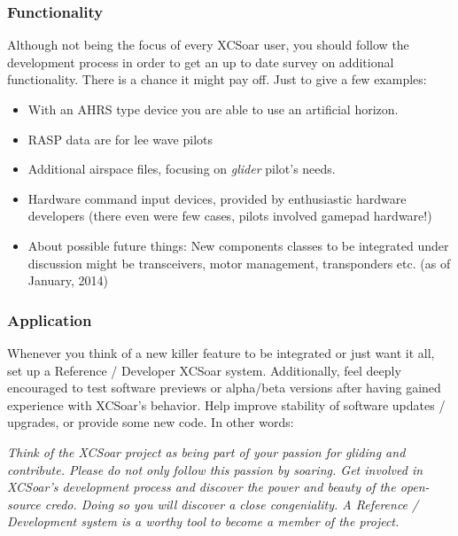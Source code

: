 \subsubsection*{Functionality} Although not being the focus of every XCSoar user,
you should follow the development process in order to get an up to date survey on 
additional functionality. There is a chance it might pay off. Just to give a few 
examples:
\begin{itemize}
\item With an AHRS type device you are able to use an artificial horizon.
\item RASP data are for lee wave pilots
\item Additional airspace files, focusing on \emph{glider} pilot's needs.
\item Hardware command input devices, provided by enthusiastic hardware 
developers (there even were few cases, pilots involved gamepad hardware!)
\item About possible future things: New components classes to be integrated  
under discussion might be transceivers, motor management, transponders etc.
(as of January, 2014)
\end{itemize}

\subsubsection*{Application} Whenever you think of a new killer feature to be 
integrated or just want it all, set up a Reference / Developer XCSoar system.
Additionally, feel deeply encouraged to test software previews or alpha/beta 
versions after having gained experience with XCSoar's behavior. Help improve 
stability of software updates / upgrades, or provide some new code. In other 
words:

\textsl{Think of the XCSoar project as being part of your passion for gliding and 
contribute. Please do not only follow this passion by soaring. Get involved in 
XCSoar's development process and discover the power and beauty of the open-source 
credo. 
Doing so you will discover a close congeniality. A Reference / Development system 
is a worthy tool to become a member of the project.}
